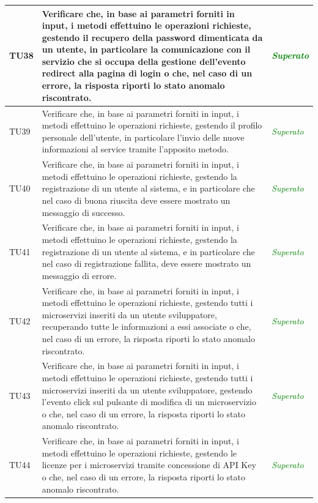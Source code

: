 \begin{longtable}{|>{\centering\arraybackslash}p{1.5cm}|>{\centering\arraybackslash}p{8cm} | >{\centering\arraybackslash}p{3.8cm}|}
		\hypertarget{TU38}{TU38} & Verificare che, in base ai parametri forniti in input, i metodi effettuino le operazioni richieste, gestendo il recupero della password dimenticata da un utente, in particolare la comunicazione con il servizio che si occupa della gestione dell'evento redirect alla pagina di login o che, nel caso di un errore, la risposta riporti lo stato anomalo riscontrato. & \textcolor{Green}{\textit{Superato}}\\ \hline
		\hypertarget{TU39}{TU39} & Verificare che, in base ai parametri forniti in input, i metodi effettuino le operazioni richieste, gestendo il profilo personale dell'utente, in particolare l'invio delle nuove informazioni al service tramite l'apposito metodo. & \textcolor{Green}{\textit{Superato}}\\ \hline
		\hypertarget{TU40}{TU40} & Verificare che, in base ai parametri forniti in input, i metodi effettuino le operazioni richieste, gestendo la registrazione di un utente al sistema, e in particolare che nel caso di buona riuscita deve essere mostrato un messaggio di successo. & \textcolor{Green}{\textit{Superato}}\\ \hline
		\hypertarget{TU41}{TU41} & Verificare che, in base ai parametri forniti in input, i metodi effettuino le operazioni richieste, gestendo la registrazione di un utente al sistema, e in particolare che nel caso di registrazione fallita, deve essere mostrato un messaggio di errore. & \textcolor{Green}{\textit{Superato}}\\ \hline
		\hypertarget{TU42}{TU42} & Verificare che, in base ai parametri forniti in input, i metodi effettuino le operazioni richieste, gestendo tutti i microservizi inseriti da un utente sviluppatore, recuperando tutte le informazioni a essi associate o che, nel caso di un errore, la risposta riporti lo stato anomalo riscontrato. & \textcolor{Green}{\textit{Superato}}\\ \hline
		\hypertarget{TU43}{TU43} & Verificare che, in base ai parametri forniti in input, i metodi effettuino le operazioni richieste, gestendo tutti i microservizi inseriti da un utente sviluppatore, gestendo l'evento click sul pulsante di modifica di un microservizio o che, nel caso di un errore, la risposta riporti lo stato anomalo riscontrato. & \textcolor{Green}{\textit{Superato}}\\ \hline
		\hypertarget{TU44}{TU44} & Verificare che, in base ai parametri forniti in input, i metodi effettuino le operazioni richieste, gestendo le licenze per i microservizi tramite concessione di API Key o che, nel caso di un errore, la risposta riporti lo stato anomalo riscontrato. & \textcolor{Green}{\textit{Superato}}\\ \hline

\end{longtable}
